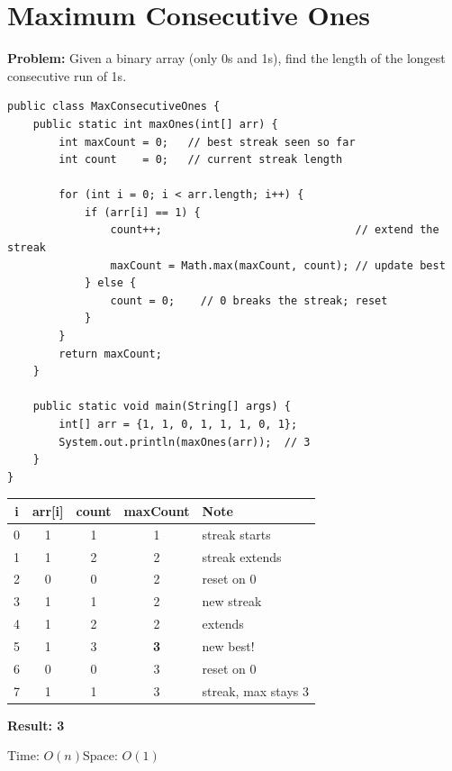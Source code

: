 \documentclass[12pt,a4paper,oneside]{book}
\begin{document}
\section{Maximum Consecutive Ones}

\textbf{Problem:} Given a binary array (only 0s and 1s), find the length of the longest consecutive run of 1s.

\begin{lstlisting}[caption={Maximum Consecutive Ones --- streak counter}]
public class MaxConsecutiveOnes {
    public static int maxOnes(int[] arr) {
        int maxCount = 0;   // best streak seen so far
        int count    = 0;   // current streak length

        for (int i = 0; i < arr.length; i++) {
            if (arr[i] == 1) {
                count++;                              // extend the streak
                maxCount = Math.max(maxCount, count); // update best
            } else {
                count = 0;    // 0 breaks the streak; reset
            }
        }
        return maxCount;
    }

    public static void main(String[] args) {
        int[] arr = {1, 1, 0, 1, 1, 1, 0, 1};
        System.out.println(maxOnes(arr));  // 3
    }
}
\end{lstlisting}

\begin{dryrun}[Dry Run: arr = \{1, 1, 0, 1, 1, 1, 0, 1\}]
\begin{center}
\begin{tabular}{ccccl}
\toprule
\textbf{i} & \textbf{arr[i]} & \textbf{count} & \textbf{maxCount} & \textbf{Note}\\
\midrule
0 & 1 & 1 & 1 & streak starts\\
1 & 1 & 2 & 2 & streak extends\\
2 & 0 & 0 & 2 & reset on 0\\
3 & 1 & 1 & 2 & new streak\\
4 & 1 & 2 & 2 & extends\\
5 & 1 & 3 & \textbf{3} & new best!\\
6 & 0 & 0 & 3 & reset on 0\\
7 & 1 & 1 & 3 & streak, max stays 3\\
\bottomrule
\end{tabular}
\end{center}
\textbf{Result: 3}
\end{dryrun}

\begin{complexity}
Time: $O(n)$\quad Space: $O(1)$
\end{complexity}
\end{document}
